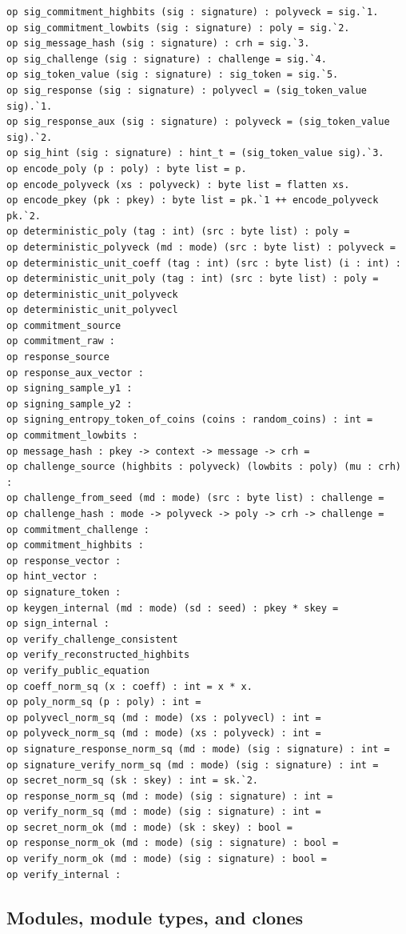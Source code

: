 \begin{lstlisting}[language=EasyCrypt,basicstyle=\ttfamily\tiny]
op sig_commitment_highbits (sig : signature) : polyveck = sig.`1.
op sig_commitment_lowbits (sig : signature) : poly = sig.`2.
op sig_message_hash (sig : signature) : crh = sig.`3.
op sig_challenge (sig : signature) : challenge = sig.`4.
op sig_token_value (sig : signature) : sig_token = sig.`5.
op sig_response (sig : signature) : polyvecl = (sig_token_value sig).`1.
op sig_response_aux (sig : signature) : polyveck = (sig_token_value sig).`2.
op sig_hint (sig : signature) : hint_t = (sig_token_value sig).`3.
op encode_poly (p : poly) : byte list = p.
op encode_polyveck (xs : polyveck) : byte list = flatten xs.
op encode_pkey (pk : pkey) : byte list = pk.`1 ++ encode_polyveck pk.`2.
op deterministic_poly (tag : int) (src : byte list) : poly =
op deterministic_polyveck (md : mode) (src : byte list) : polyveck =
op deterministic_unit_coeff (tag : int) (src : byte list) (i : int) :
op deterministic_unit_poly (tag : int) (src : byte list) : poly =
op deterministic_unit_polyveck
op deterministic_unit_polyvecl
op commitment_source
op commitment_raw :
op response_source
op response_aux_vector :
op signing_sample_y1 :
op signing_sample_y2 :
op signing_entropy_token_of_coins (coins : random_coins) : int =
op commitment_lowbits :
op message_hash : pkey -> context -> message -> crh =
op challenge_source (highbits : polyveck) (lowbits : poly) (mu : crh) :
op challenge_from_seed (md : mode) (src : byte list) : challenge =
op challenge_hash : mode -> polyveck -> poly -> crh -> challenge =
op commitment_challenge :
op commitment_highbits :
op response_vector :
op hint_vector :
op signature_token :
op keygen_internal (md : mode) (sd : seed) : pkey * skey =
op sign_internal :
op verify_challenge_consistent
op verify_reconstructed_highbits
op verify_public_equation
op coeff_norm_sq (x : coeff) : int = x * x.
op poly_norm_sq (p : poly) : int =
op polyvecl_norm_sq (md : mode) (xs : polyvecl) : int =
op polyveck_norm_sq (md : mode) (xs : polyveck) : int =
op signature_response_norm_sq (md : mode) (sig : signature) : int =
op signature_verify_norm_sq (md : mode) (sig : signature) : int =
op secret_norm_sq (sk : skey) : int = sk.`2.
op response_norm_sq (md : mode) (sig : signature) : int =
op verify_norm_sq (md : mode) (sig : signature) : int =
op secret_norm_ok (md : mode) (sk : skey) : bool =
op response_norm_ok (md : mode) (sig : signature) : bool =
op verify_norm_ok (md : mode) (sig : signature) : bool =
op verify_internal :
\end{lstlisting}

\subsection*{Modules, module types, and clones}
\begin{lstlisting}[language=EasyCrypt,basicstyle=\ttfamily\tiny]
\end{lstlisting}

